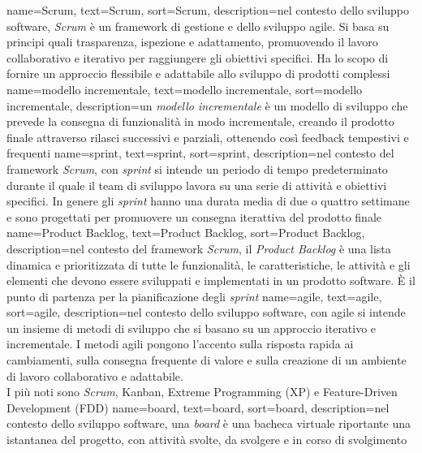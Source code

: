 {
    name={Scrum},
    text=Scrum,
    sort=Scrum,
    description={nel contesto dello sviluppo software, \textit{Scrum} è un framework di gestione e dello sviluppo agile. Si basa su principi quali trasparenza, ispezione 
    e adattamento, promuovendo il lavoro collaborativo e iterativo per raggiungere gli obiettivi specifici. Ha lo scopo di fornire un approccio 
    flessibile e adattabile allo sviluppo di prodotti complessi}
}
{
    name={modello incrementale},
    text=modello incrementale,
    sort=modello incrementale,
    description={un \textit{modello incrementale} è un modello di sviluppo che prevede la consegna di funzionalità in modo incrementale, creando 
    il prodotto finale attraverso rilasci successivi e parziali, ottenendo così feedback tempestivi e frequenti}
}
{
    name={sprint},
    text=sprint,
    sort=sprint,
    description={nel contesto del framework \textit{Scrum}, con \textit{sprint} si intende un periodo di tempo predeterminato durante il quale il team di sviluppo lavora su una serie di attività e obiettivi specifici. In genere 
    gli \textit{sprint} hanno una durata media di due o quattro settimane e sono progettati per promuovere un consegna iterattiva 
    del prodotto finale}
}
{
    name={Product Backlog},
    text=Product Backlog,
    sort=Product Backlog,
    description={nel contesto del framework \textit{Scrum}, il \textit{Product Backlog} è una lista dinamica e prioritizzata di tutte le funzionalità, le caratteristiche, le attività e gli elementi che devono essere sviluppati e implementati in un prodotto software. È
    il punto di partenza per la pianificazione degli \textit{sprint}}
}
{
    name={agile},
    text=agile,
    sort=agile,
    description={nel contesto dello sviluppo software, con agile si intende un insieme di metodi di sviluppo che si basano su un approccio iterativo e incrementale. 
    I metodi agili pongono l'accento sulla risposta rapida ai cambiamenti, sulla consegna frequente di valore e sulla creazione di un ambiente di lavoro collaborativo e adattabile.
    \\I più noti sono \textit{Scrum}, Kanban, Extreme Programming (XP) e Feature-Driven Development (FDD)}
}
{
    name={board},
    text=board,
    sort=board,
    description={nel contesto dello sviluppo software, una \textit{board} è una bacheca virtuale riportante 
    una istantanea del progetto, con attività svolte, da svolgere e in corso di svolgimento}
}
